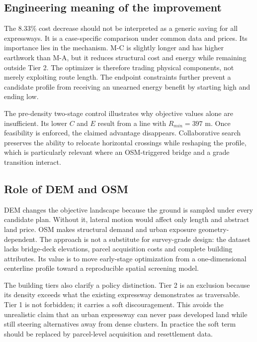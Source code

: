 \documentclass[preprint,12pt]{elsarticle}
\begin{document}
\subsection{Engineering meaning of the improvement}

The 8.33\% cost decrease should not be interpreted as a generic saving for all expressways. It is a case-specific comparison under common data and prices. Its importance lies in the mechanism. M-C is slightly longer and has higher earthwork than M-A, but it reduces structural cost and energy while remaining outside Tier 2. The optimizer is therefore trading physical components, not merely exploiting route length. The endpoint constraints further prevent a candidate profile from receiving an unearned energy benefit by starting high and ending low.

The pre-density two-stage control illustrates why objective values alone are insufficient. Its lower $C$ and $E$ result from a line with $R_{min}=397$ m. Once feasibility is enforced, the claimed advantage disappears. Collaborative search preserves the ability to relocate horizontal crossings while reshaping the profile, which is particularly relevant where an OSM-triggered bridge and a grade transition interact.

\subsection{Role of DEM and OSM}

DEM changes the objective landscape because the ground is sampled under every candidate plan. Without it, lateral motion would affect only length and abstract land price. OSM makes structural demand and urban exposure geometry-dependent. The approach is not a substitute for survey-grade design: the dataset lacks bridge-deck elevations, parcel acquisition costs and complete building attributes. Its value is to move early-stage optimization from a one-dimensional centerline profile toward a reproducible spatial screening model.

The building tiers also clarify a policy distinction. Tier 2 is an exclusion because its density exceeds what the existing expressway demonstrates as traversable. Tier 1 is not forbidden; it carries a soft discouragement. This avoids the unrealistic claim that an urban expressway can never pass developed land while still steering alternatives away from dense clusters. In practice the soft term should be replaced by parcel-level acquisition and resettlement data.
\end{document}

